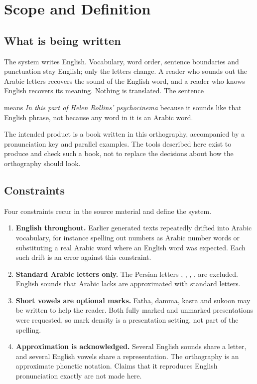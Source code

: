 \chapter{Scope and Definition}

\section{What is being written}
The system writes English. Vocabulary, word order, sentence boundaries and punctuation stay English; only the letters change. A reader who sounds out the Arabic letters recovers the sound of the English word, and a reader who knows English recovers its meaning. Nothing is translated. The sentence
\begin{quote}\end{quote}
means \emph{In this part of Helen Rollins' psychocinema} because it sounds like that English phrase, not because any word in it is an Arabic word.

The intended product is a book written in this orthography, accompanied by a pronunciation key and parallel examples. The tools described here exist to produce and check such a book, not to replace the decisions about how the orthography should look.

\section{Constraints}
Four constraints recur in the source material and define the system.
\begin{enumerate}
\item \textbf{English throughout.} Earlier generated texts repeatedly drifted into Arabic vocabulary, for instance spelling out numbers as Arabic number words or substituting a real Arabic word where an English word was expected. Each such drift is an error against this constraint.
\item \textbf{Standard Arabic letters only.} The Persian letters , , , ,  are excluded. English sounds that Arabic lacks are approximated with standard letters.
\item \textbf{Short vowels are optional marks.} Fatha, damma, kasra and sukoon may be written to help the reader. Both fully marked and unmarked presentations were requested, so mark density is a presentation setting, not part of the spelling.
\item \textbf{Approximation is acknowledged.} Several English sounds share a letter, and several English vowels share a representation. The orthography is an approximate phonetic notation. Claims that it reproduces English pronunciation exactly are not made here.
\end{enumerate}

